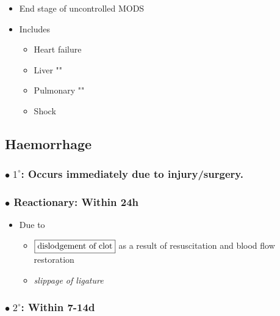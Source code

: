 \documentclass[
  14pt,
]{extarticle}
\providecommand{\tightlist}{%
  \setlength{\itemsep}{0pt}\setlength{\parskip}{0pt}}
\begin{document}
\begin{itemize}
\tightlist
\item
  End stage of uncontrolled MODS
\item
  Includes

  \begin{itemize}
  \tightlist
  \item
    Heart failure
  \item
    Liver ""
  \item
    Pulmonary ""
  \item
    Shock
  \end{itemize}
\end{itemize}

\hypertarget{haemorrhage}{%
\subsection{Haemorrhage}\label{haemorrhage}}

\hypertarget{bullet-1circ-occurs-immediately-due-to-injurysurgery.}{%
\subsubsection{\texorpdfstring{\(\bullet\; 1^\circ\): Occurs immediately
due to
injury/surgery.}{\textbackslash bullet\textbackslash; 1\^{}\textbackslash circ: Occurs immediately due to injury/surgery.}}\label{bullet-1circ-occurs-immediately-due-to-injurysurgery.}}

\hypertarget{bullet-reactionary-within-24h}{%
\subsubsection{\texorpdfstring{\(\bullet\) Reactionary: Within
24h}{\textbackslash bullet Reactionary: Within 24h}}\label{bullet-reactionary-within-24h}}

\begin{itemize}
\tightlist
\item
  Due to

  \begin{itemize}
  \tightlist
  \item
    \(\fbox{dislodgement of clot}\) as a result of resuscitation and
    blood flow restoration
  \item
    \emph{slippage of ligature}
  \end{itemize}
\end{itemize}

\hypertarget{bullet-2circ-within-7-14d}{%
\subsubsection{\texorpdfstring{\(\bullet\; 2^\circ\): Within
7-14d}{\textbackslash bullet\textbackslash; 2\^{}\textbackslash circ: Within 7-14d}}\label{bullet-2circ-within-7-14d}}
\end{document}
